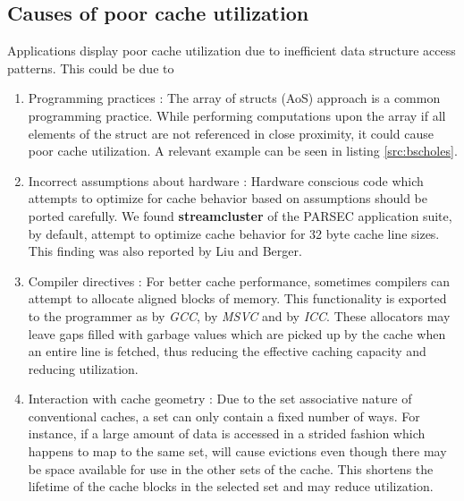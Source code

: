 \subsection{Causes of poor cache utilization}

Applications display poor cache utilization due to inefficient data structure access patterns. This could be due to 
\begin{enumerate}
  \item Programming practices : The array of structs (AoS) approach is a common programming practice. While performing computations upon the array if all elements of the struct are not referenced in close proximity, it could cause poor cache utilization. A relevant example can be seen in listing \ref{src:bscholes}.
  \item Incorrect assumptions about hardware : Hardware conscious code which attempts to optimize for cache behavior based on assumptions should be ported carefully. We found \textbf{streamcluster} of the PARSEC application suite, by default, attempt to optimize cache behavior for 32 byte cache line sizes. This finding was also reported by Liu and Berger\cite{Liu:2011:SPD:2048066.2048070}.
  \item Compiler directives : For better cache performance, sometimes compilers can attempt to allocate aligned blocks of memory. This functionality is exported to the programmer as  by \textit{GCC},  by \textit{MSVC} and  by \textit{ICC}. These allocators may leave gaps filled with garbage values which are picked up by the cache when an entire line is fetched, thus reducing the effective caching capacity and reducing utilization.
  \item Interaction with cache geometry : Due to the set associative nature of conventional caches, a set can only contain a fixed number of ways. For instance, if a large amount of data is accessed in a strided fashion which happens to map to the same set, will cause evictions even though there may be space available for use in the other sets of the cache. This shortens the lifetime of the cache blocks in the selected set and may reduce utilization.
\end{enumerate}

